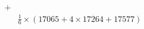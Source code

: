 \documentclass[preview]{standalone}
\begin{document}
\begin{align*}
+&\\&\frac{1}{6}\times(17065+4\times17264+17577)
\end{align*}
\end{document}
